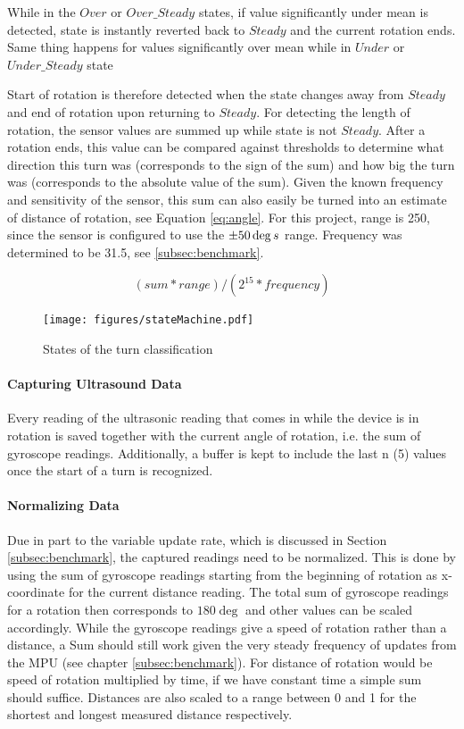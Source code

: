 While in the $Over$ or $Over\_Steady$ states, if value significantly under mean is detected, state is instantly reverted back to $Steady$ and the current rotation ends. Same thing happens for values significantly over mean while in $Under$ or $Under\_Steady$ state

Start of rotation is therefore detected when the state changes away from $Steady$ and end of rotation upon returning to $Steady$.
For detecting the length of rotation, the sensor values are summed up while state is not $Steady$.
After a rotation ends, this value can be compared against thresholds to determine what direction this turn was (corresponds to the sign of the sum) and how big the turn was (corresponds to the absolute value of the sum).
Given the known frequency and sensitivity of the sensor, this sum can also easily be turned into an estimate of distance of rotation, see Equation \ref{eq:angle}. For this project, range is 250, since the sensor is configured to use the $\pm50\deg\\s$ range. Frequency was determined to be 31.5, see \ref{subsec:benchmark}.

\begin{equation}
    (sum * range) / (2 ^{15}  * frequency)
    \label{eq:angle}
\end{equation}

\begin{figure}
    \centering
    \texttt{[image: figures/stateMachine.pdf]}
    \caption{States of the turn classification}

    \label{fig:stateMachine}
\end{figure}

\paragraph{Capturing Ultrasound Data}
Every reading of the ultrasonic reading that comes in while the device is in rotation is saved together with the current angle of rotation, i.e. the sum of gyroscope readings. Additionally, a buffer is kept to include the last n (5) values once the start of a turn is recognized.

\paragraph{Normalizing Data}
Due in part to the variable update rate, which is discussed in Section \ref{subsec:benchmark}, the captured readings need to be normalized.
This is done by using the sum of gyroscope readings starting from the beginning of rotation as x-coordinate for the current distance reading.
The total sum of gyroscope readings for a rotation then corresponds to $180\deg$ and other values can be scaled accordingly.
While the gyroscope readings give a speed of rotation rather than a distance, a Sum should still work given the very steady frequency of updates from the MPU (see chapter \ref{subsec:benchmark}).
For distance of rotation would be speed of rotation multiplied by time, if we have constant time a simple sum should suffice.
Distances are also scaled to a range between 0 and 1 for the shortest and longest measured distance respectively.


